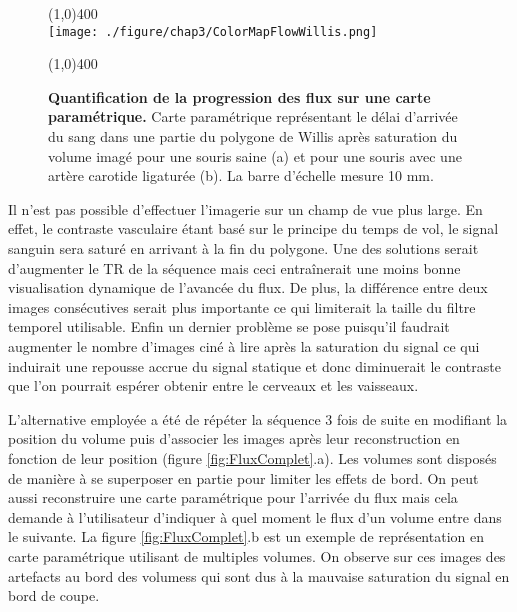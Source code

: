 \begin{figure}[H]
\centering \line(1,0){400} \\
\texttt{[image: ./figure/chap3/ColorMapFlowWillis.png]}
\caption[Quantification de la progression des flux sur une carte paramétrique.]{\label{fig:ColorMapFlowWillis} \textbf{Quantification de la progression des flux sur une carte paramétrique.} Carte paramétrique représentant le délai d'arrivée du sang dans une partie du polygone de Willis après saturation du volume imagé pour une souris saine (a) et pour une souris avec une artère carotide ligaturée (b). La barre d'échelle mesure 10 mm.}
\line(1,0){400} \\ \end{figure}

Il n'est pas possible d'effectuer l'imagerie sur un champ de vue plus large. En effet, le contraste vasculaire étant basé sur le principe du temps de vol, le signal sanguin sera saturé en arrivant à la fin du polygone. Une des solutions serait d'augmenter le TR de la séquence mais ceci entraînerait une moins bonne visualisation dynamique de l'avancée du flux. De plus, la différence entre deux images consécutives serait plus importante ce qui limiterait la taille du filtre temporel utilisable. Enfin un dernier problème se pose puisqu'il faudrait augmenter le nombre d'images ciné à lire après la saturation du signal ce qui induirait une repousse accrue du signal statique et donc diminuerait le contraste que l'on pourrait espérer obtenir entre le cerveaux et les vaisseaux.

L'alternative employée a été de répéter la séquence 3 fois de suite en modifiant la position du volume puis d'associer les images après leur reconstruction en fonction de leur position (figure \ref{fig:FluxComplet}.a). Les volumes sont disposés de manière à se superposer en partie pour limiter les effets de bord. On peut aussi reconstruire une carte paramétrique pour l'arrivée du flux mais cela demande à l'utilisateur d'indiquer à quel moment le flux d'un volume entre dans le suivante. La figure \ref{fig:FluxComplet}.b est un exemple de représentation en carte paramétrique utilisant de multiples volumes. On observe sur ces images des artefacts au bord des volumess qui sont dus à la mauvaise saturation du signal en bord de coupe.

